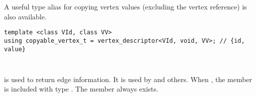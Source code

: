 A useful type alias for copying vertex values (excluding the vertex reference) is also available.
\begin{lstlisting}
template <class VId, class VV>
using copyable_vertex_t = vertex_descriptor<VId, void, VV>; // {id, value}
\end{lstlisting}

\subsubsection{}\label{edge-view}\mbox{} \\
 is used to return edge information. It is used by 
 and others. 
When , the  member is included with type . The  member always exists.

{\small
     
}

